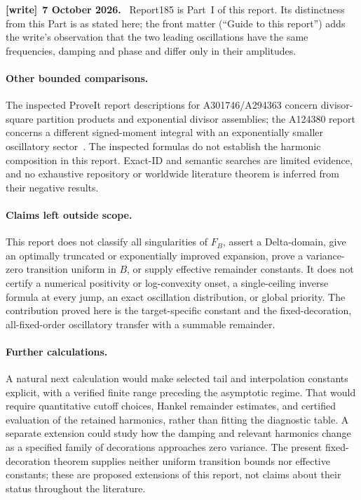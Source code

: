 \documentclass[11pt]{article}
\theoremstyle{definition}\newtheorem{definition}[theorem]{Definition}
\theoremstyle{remark}\newtheorem{remark}[theorem]{Remark}
\newenvironment{writenote}[1][]{\par\smallskip\begingroup\small
 \noindent\textbf{[write]}\if\relax\detokenize{#1}\relax\else~\textbf{#1.}\fi\ }%
 {\par\endgroup\smallskip}
\begin{document}
\begin{writenote}[7 October 2026]
Report185 is Part~I of this report. Its distinctness from this Part is as stated here; the front matter (``Guide to this report'') adds the write's observation that the two leading oscillations have the same frequencies, damping and phase and differ only in their amplitudes.
\end{writenote}

\paragraph{Other bounded comparisons.}
The inspected ProveIt report descriptions for A301746/A294363 concern
divisor-square partition products and exponential divisor assemblies;
the A124380 report concerns a different signed-moment integral with
an exponentially smaller oscillatory sector~\cite{provitdiv,provitsigned}.
The inspected formulas do not establish the harmonic composition
in this report. Exact-ID and semantic searches are limited evidence,
and no exhaustive repository or worldwide literature theorem is
inferred from their negative results.

\paragraph{Claims left outside scope.}
This report does not classify all singularities of $F_B$, assert a
Delta-domain, give an optimally truncated or exponentially improved
expansion, prove a variance-zero transition uniform in $B$, or supply
effective remainder constants. It does not certify a numerical
positivity or log-convexity onset, a single-ceiling inverse formula
at every jump, an exact oscillation distribution, or global priority.
The contribution proved here is the target-specific constant and the
fixed-decoration, all-fixed-order oscillatory transfer with a
summable remainder.

\paragraph{Further calculations.}
A natural next calculation would make selected tail and interpolation
constants explicit, with a verified finite range preceding the
asymptotic regime. That would require quantitative cutoff choices,
Hankel remainder estimates, and certified evaluation of the retained
harmonics, rather than fitting the diagnostic table. A separate
extension could study how the damping and relevant harmonics change
as a specified family of decorations approaches zero variance. The
present fixed-decoration theorem supplies neither uniform transition
bounds nor effective constants; these are proposed extensions of this
report, not claims about their status throughout the literature.
\end{document}
